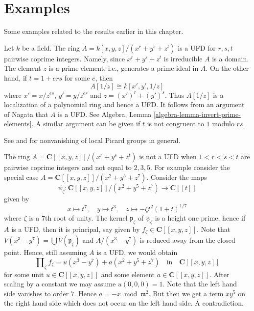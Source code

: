 \section{Examples}
\label{section-examples}

\noindent
Some examples related to the results earlier in this chapter.

\begin{example}
\label{example-factorial}
\begin{reference}
\cite[4(c)]{Samuel-UFD}
\end{reference}
Let $k$ be a field. The ring $A = k[x, y, z]/(x^r + y^s + z^t)$
is a UFD for $r, s, t$ pairwise coprime integers. Namely, since
$x^r + y^s + z^t$ is irreducible $A$ is a domain. The element $z$
is a prime element, i.e., generates a prime ideal in $A$.
On the other hand, if $t = 1 + ers$ for some $e$, then
$$
A[1/z] \cong k[x', y', 1/z]
$$
where $x' = x/z^{es}$, $y' = y/z^{er}$ and $z = (x')^r + (y')^s$.
Thus $A[1/z]$ is a localization of a polynomial ring and hence
a UFD. It follows from an argument of Nagata that $A$ is a UFD.
See Algebra, Lemma \ref{algebra-lemma-invert-prime-elements}.
A similar argument can be given if $t$ is not congruent to $1$
modulo $rs$.
\end{example}

\begin{example}
\label{example-completion-not-factorial}
\begin{reference}
See \cite{Brieskorn} and \cite{Lipman-rational} for nonvanishing of
local Picard groups in general.
\end{reference}
The ring $A = \mathbf{C}[[x, y, z]]/(x^r + y^s + z^t)$
is not a UFD when $1 < r < s < t$ are pairwise coprime integers
and not equal to $2, 3, 5$. For example consider the special
case $A = \mathbf{C}[[x, y, z]]/(x^2 + y^5 + z^7)$.
Consider the maps
$$
\psi_\zeta : \mathbf{C}[[x, y, z]]/(x^2 + y^5 + z^7) \to \mathbf{C}[[t]]
$$
given by
$$
x \mapsto t^7,\quad
y \mapsto t^3,\quad
z \mapsto -\zeta t^2(1 + t)^{1/7}
$$
where $\zeta$ is a $7$th root of unity. The kernel $\mathfrak p_\zeta$
of $\psi_\zeta$ is a height one prime, hence if $A$ is a UFD, then
it is principal, say given by $f_\zeta \in \mathbf{C}[[x, y, z]]$.
Note that $V(x^3 - y^7) = \bigcup V(\mathfrak p_\zeta)$
and $A/(x^3 - y^7)$ is reduced away from the closed point. Hence,
still assuming $A$ is a UFD, we would obtain
$$
\prod\nolimits_\zeta f_\zeta = u(x^3 - y^7) + a(x^2 + y^5 + z^7)
\quad\text{in}\quad
\mathbf{C}[[x, y, z]]
$$
for some unit $u \in \mathbf{C}[[x, y, z]]$ and some
element $a \in \mathbf{C}[[x, y, z]]$. After scaling by a constant
we may assume $u(0, 0, 0) = 1$. Note that the left hand side vanishes to
order $7$. Hence $a = - x \bmod \mathfrak m^2$. But then we get a term
$xy^5$ on the right hand side which does not occur on the left
hand side. A contradiction.
\end{example}

